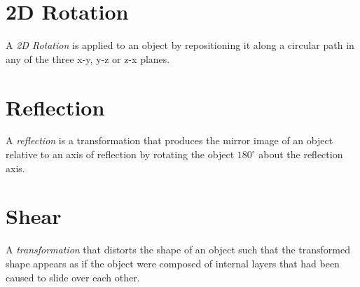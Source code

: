 \documentclass[a4paper,12pt,titlepage]{article}
\begin{document}
\pagebreak
\section{2D Rotation}
A \emph{2D Rotation} is applied to an object by repositioning it along a circular path in any of the three x-y, y-z or z-x planes.

\pagebreak
\section{Reflection}
A \emph{reflection} is a transformation that produces the mirror image of an object relative to an axis of reflection by rotating the object $180^\circ$ about the reflection axis. 
\pagebreak
\section{Shear}
A \emph{transformation} that distorts the shape of an object such that the transformed shape appears as if the object were composed of internal layers that had been caused to slide over each other.

\pagebreak
\end{document}
